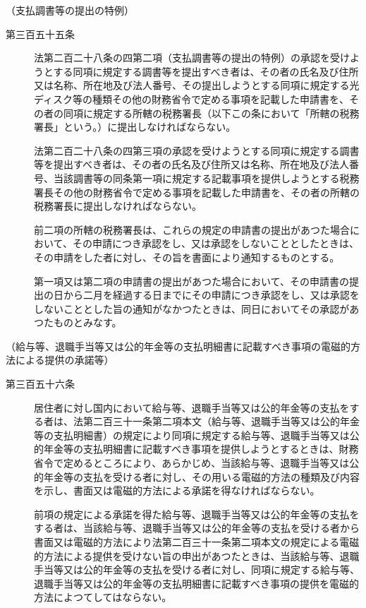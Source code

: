 \documentclass[twocolumn,a4j,10pt]{ltjtarticle}
\begin{document}
\noindent\hspace{10pt}（支払調書等の提出の特例）
\begin{description}
\item[第三百五十五条]法第二百二十八条の四第二項（支払調書等の提出の特例）の承認を受けようとする同項に規定する調書等を提出すべき者は、その者の氏名及び住所又は名称、所在地及び法人番号、その提出しようとする同項に規定する光ディスク等の種類その他の財務省令で定める事項を記載した申請書を、その者の同項に規定する所轄の税務署長（以下この条において「所轄の税務署長」という。）に提出しなければならない。
\item[]法第二百二十八条の四第三項の承認を受けようとする同項に規定する調書等を提出すべき者は、その者の氏名及び住所又は名称、所在地及び法人番号、当該調書等の同条第一項に規定する記載事項を提供しようとする税務署長その他の財務省令で定める事項を記載した申請書を、その者の所轄の税務署長に提出しなければならない。
\item[]前二項の所轄の税務署長は、これらの規定の申請書の提出があつた場合において、その申請につき承認をし、又は承認をしないこととしたときは、その申請をした者に対し、その旨を書面により通知するものとする。
\item[]第一項又は第二項の申請書の提出があつた場合において、その申請書の提出の日から二月を経過する日までにその申請につき承認をし、又は承認をしないこととした旨の通知がなかつたときは、同日においてその承認があつたものとみなす。
\end{description}
\noindent\hspace{10pt}（給与等、退職手当等又は公的年金等の支払明細書に記載すべき事項の電磁的方法による提供の承諾等）
\begin{description}
\item[第三百五十六条]居住者に対し国内において給与等、退職手当等又は公的年金等の支払をする者は、法第二百三十一条第二項本文（給与等、退職手当等又は公的年金等の支払明細書）の規定により同項に規定する給与等、退職手当等又は公的年金等の支払明細書に記載すべき事項を提供しようとするときは、財務省令で定めるところにより、あらかじめ、当該給与等、退職手当等又は公的年金等の支払を受ける者に対し、その用いる電磁的方法の種類及び内容を示し、書面又は電磁的方法による承諾を得なければならない。
\item[]前項の規定による承諾を得た給与等、退職手当等又は公的年金等の支払をする者は、当該給与等、退職手当等又は公的年金等の支払を受ける者から書面又は電磁的方法により法第二百三十一条第二項本文の規定による電磁的方法による提供を受けない旨の申出があつたときは、当該給与等、退職手当等又は公的年金等の支払を受ける者に対し、同項に規定する給与等、退職手当等又は公的年金等の支払明細書に記載すべき事項の提供を電磁的方法によつてしてはならない。
\end{description}
\end{document}
